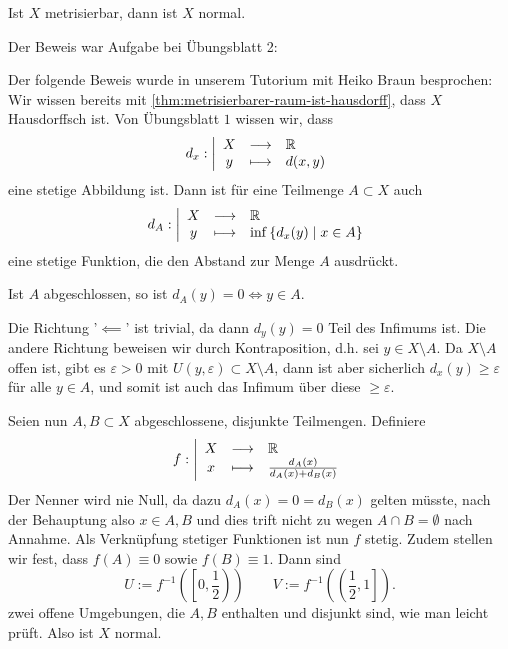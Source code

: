 \begin{theorem}\label{thm:metrischer-raum-ist-normal}
    Ist $X$ metrisierbar, dann ist  $X$ normal.
\end{theorem}

Der Beweis war Aufgabe bei Übungsblatt 2:
\begin{proof*}
    Der folgende Beweis wurde in unserem Tutorium mit {\sc Heiko Braun} besprochen: \\
    Wir wissen bereits mit \autoref{thm:metrisierbarer-raum-ist-hausdorff}, dass $X$ Hausdorffsch ist. Von Übungsblatt $1$ wissen wir, dass
        \begin{equation*}
        d_x: \left| \begin{array}{c c l} 
        X & \longrightarrow & \mathbb{R} \\
        y & \longmapsto &  d(x,y)
        \end{array} \right.
    \end{equation*}
    eine stetige Abbildung ist. Dann ist für eine Teilmenge $A\subset X$ auch
        \begin{equation*}
        d_A: \left| \begin{array}{c c l} 
        X & \longrightarrow & \mathbb{R} \\
        y & \longmapsto &  \inf \left \{d_x(y) \mid x\in A\right\} 
        \end{array} \right.
    \end{equation*}
    eine stetige Funktion, die den Abstand zur Menge $A$ ausdrückt.
    \begin{claim}
        Ist $A$ abgeschlossen, so ist $d_A(y) = 0 \iff y\in A$.
    \end{claim}
    \begin{subproof}
        Die Richtung '$ \impliedby$' ist trivial, da dann $d_y(y) = 0$ Teil des Infimums ist. Die andere Richtung beweisen wir durch Kontraposition, d.h. sei $y \in X\setminus A$. Da $X \setminus A$ offen ist, gibt es $ε>0$ mit $U(y,ε) \subset X\setminus A$, dann ist aber sicherlich $d_x(y) \geq ε$ für alle $y \in A$, und somit ist auch das Infimum über diese $ \geq ε$.
    \end{subproof}
Seien nun $A,B \subset X$ abgeschlossene, disjunkte Teilmengen. Definiere
\begin{equation*}
        f: \left| \begin{array}{c c l} 
        X & \longrightarrow & \mathbb{R} \\
        x & \longmapsto &  \frac{d_A(x)}{d_A(x) + d_B(x)}
        \end{array} \right.
    \end{equation*}
    Der Nenner wird nie Null, da dazu $d_A(x) = 0 = d_B(x)$ gelten müsste, nach der Behauptung also  $x\in A,B$ und dies trift nicht zu wegen $A\cap B = \emptyset$ nach Annahme. Als Verknüpfung stetiger Funktionen ist nun $f$ stetig. Zudem stellen wir fest, dass  $f(A) \equiv 0$ sowie $f(B) \equiv 1$. Dann sind
     \[
         U := f^{-1}\left( \left[ 0,\frac{1}{2} \right)  \right)  \qquad V := f^{-1}\left( \left( \frac{1}{2},1 \right]  \right) 
    .\] 
    zwei offene Umgebungen, die $A,B$ enthalten und disjunkt sind, wie man leicht prüft. Also ist  $X$ normal.
\end{proof*}
